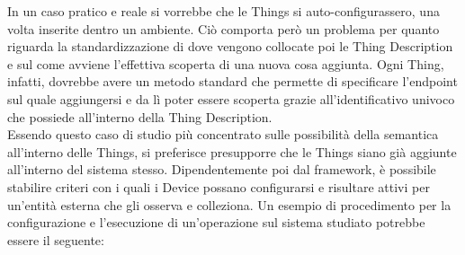 \documentclass[12pt,a4paper,openright,oneside]{report}
\begin{document}
In un caso pratico e reale si vorrebbe che le Things si auto-configurassero, una volta inserite dentro un ambiente. Ciò comporta però un problema per quanto riguarda la standardizzazione di dove vengono collocate poi le Thing Description e sul come avviene l'effettiva scoperta di una nuova cosa aggiunta. Ogni Thing, infatti, dovrebbe avere un metodo standard che permette di specificare l'endpoint sul quale aggiungersi e da lì poter essere scoperta grazie all'identificativo univoco che possiede all'interno della Thing Description.\\

Essendo questo caso di studio più concentrato sulle possibilità della semantica all'interno delle Things, si preferisce presupporre che le Things siano già aggiunte all'interno del sistema stesso. Dipendentemente poi dal framework, è possibile stabilire criteri con i quali i Device possano configurarsi e risultare attivi per un'entità esterna che gli osserva e colleziona. Un esempio di procedimento per la configurazione e l'esecuzione di un'operazione sul sistema studiato potrebbe essere il seguente:
\end{document}
